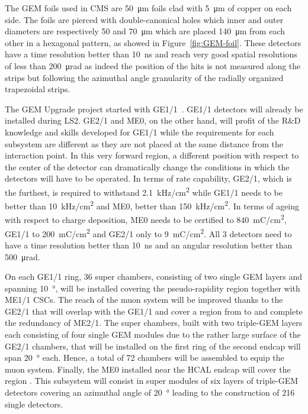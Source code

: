 	The GEM foils used in CMS are \SI{50}{\micro m} foils clad with \SI{5}{\micro m} of copper on each side. The foils are pierced with double-canonical holes which inner and outer diameters are respectively 50 and \SI{70}{\micro m} which are placed \SI{140}{\micro m} from each other in a hexagonal pattern, as showed in Figure~\ref{fig:GEM-foil}. These detectors have a time resolution better than \SI{10}{ns} and reach very good spatial resolutions of less than \SI{200}{\micro rad} as indeed the position of the hits is not measured along the strips but following the azimuthal angle granularity of the radially organized trapezoidal strips. 
	
	The GEM Upgrade project started with GE1/1~\cite{GEM11TDR}. GE1/1 detectors will already be installed during LS2. GE2/1 and ME0, on the other hand, will profit of the R\&D knowledge and skills developed for GE1/1 while the requirements for each subsystem are different as they are not placed at the same distance from the interaction point. In this very forward region, a different position with respect to the center of the detector can dramatically change the conditions in which the detectors will have to be operated. In terms of rate capability, GE2/1, which is the furthest, is required to withstand \SI{2.1}{kHz/cm^2} while GE1/1 needs to be better than \SI{10}{kHz/cm^2} and ME0, better than \SI{150}{kHz/cm^2}. In terms of ageing with respect to charge deposition, ME0 needs to be certified to \SI{840}{mC/cm^2}, GE1/1 to \SI{200}{mC/cm^2} and GE2/1 only to \SI{9}{mC/cm^2}. All 3 detectors need to have a time resolution better than \SI{10}{ns} and an angular resolution better than \SI{500}{\micro rad}.
	
\endgroup
	
	On each GE1/1 ring, 36 super chambers, consisting of two single GEM layers and spanning \SI{10}{\degree}, will be installed covering the pseudo-rapidity region  together with ME1/1 CSCs. The reach of the muon system will be improved thanks to the GE2/1 that will overlap with the GE1/1 and cover a region from  to  and complete the redundancy of ME2/1. The super chambers, built with two triple-GEM layers each consisting of four single GEM modules due to the rather large surface of the GE2/1 chambers, that will be installed on the first ring of the second endcap will span \SI{20}{\degree} each. Hence, a total of 72 chambers will be assembled to equip the muon system. Finally, the ME0 installed near the HCAL endcap will cover the region . This subsystem will consist in super modules of six layers of triple-GEM detectors covering an azimuthal angle of \SI{20}{\degree} leading to the construction of 216 single detectors.
	
